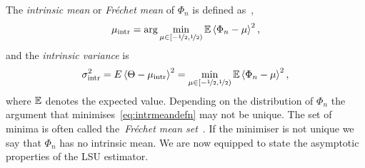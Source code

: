 \documentclass[journal]{IEEEtran}
\begin{document}
The \emph{intrinsic mean} or \emph{Fr\'{e}chet mean} of $\Phi_n$ is defined as~\cite{McKilliam_mean_dir_est_sq_arc_length2010,bwhk07a,Bhattacharya_int_ext_means_2003,Bhattacharya_int_ext_means_2005},
\begin{equation}\label{eq:intrmeandefn}
 \mu_{\text{intr}}  = \arg \min_{\mu \in [-\nicefrac{1}{2}, \nicefrac{1}{2})} \expect \fracpart{\Phi_n - \mu}^2, 
\end{equation}
and the \emph{intrinsic variance} is
\[
\sigma_{\text{intr}}^2 = E\left\langle \Theta - \mu_{\text{intr}} \right\rangle^2 = \min_{\mu \in [-\nicefrac{1}{2}, \nicefrac{1}{2})} {\mathbb E} \left\langle \Phi_n - \mu \right\rangle^2,
\]
where ${\mathbb E}$ denotes the expected value.  Depending on the distribution of $\Phi_n$ the argument that minimises~\eqref{eq:intrmeandefn} may not be unique.  The set of minima is often called the~\emph{Fr\'{e}chet mean set}~\cite{Bhattacharya_int_ext_means_2003,Bhattacharya_int_ext_means_2005}.  If the minimiser is not unique we say that $\Phi_n$ has no intrinsic mean.  We are now equipped to state the asymptotic properties of the LSU estimator.


 
\end{document}
